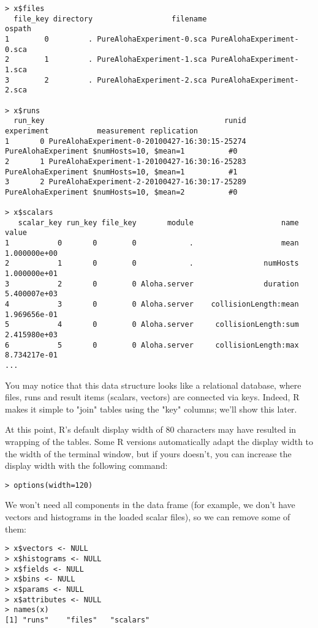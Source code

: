 \begin{verbatim}
> x$files
  file_key directory                  filename                    ospath
1        0         . PureAlohaExperiment-0.sca PureAlohaExperiment-0.sca
2        1         . PureAlohaExperiment-1.sca PureAlohaExperiment-1.sca
3        2         . PureAlohaExperiment-2.sca PureAlohaExperiment-2.sca

> x$runs
  run_key                                         runid          experiment           measurement replication
1       0 PureAlohaExperiment-0-20100427-16:30:15-25274 PureAlohaExperiment $numHosts=10, $mean=1          #0
2       1 PureAlohaExperiment-1-20100427-16:30:16-25283 PureAlohaExperiment $numHosts=10, $mean=1          #1
3       2 PureAlohaExperiment-2-20100427-16:30:17-25289 PureAlohaExperiment $numHosts=10, $mean=2          #0

> x$scalars
   scalar_key run_key file_key       module                    name        value
1           0       0        0            .                    mean 1.000000e+00
2           1       0        0            .                numHosts 1.000000e+01
3           2       0        0 Aloha.server                duration 5.400007e+03
4           3       0        0 Aloha.server    collisionLength:mean 1.969656e-01
5           4       0        0 Aloha.server     collisionLength:sum 2.415980e+03
6           5       0        0 Aloha.server     collisionLength:max 8.734217e-01
...
\end{verbatim}

You may notice that this data structure looks like a relational database, where
files, runs and result items (scalars, vectors) are connected via keys. Indeed,
R makes it simple to "join" tables using the "key" columns; we'll show this later.

At this point, R's default display width of 80 characters may have resulted in wrapping
of the tables. Some R versions automatically adapt the display width to the width of the
terminal window, but if yours doesn't, you can increase the display width with the
following command:

\begin{verbatim}
> options(width=120)
\end{verbatim}

We won't need all components in the data frame (for example, we don't have vectors 
and histograms in the loaded scalar files), so we can remove some of them:
 
\begin{verbatim}
> x$vectors <- NULL
> x$histograms <- NULL
> x$fields <- NULL
> x$bins <- NULL
> x$params <- NULL
> x$attributes <- NULL
> names(x)
[1] "runs"    "files"   "scalars"
\end{verbatim}


